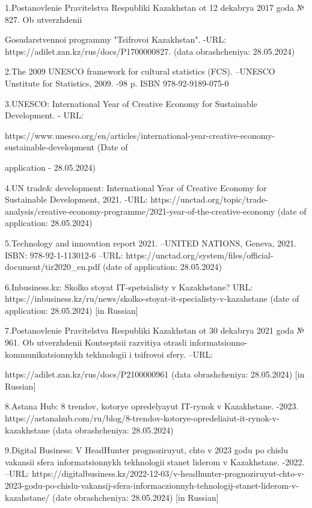 \begin{noparindent}
1.Postanovlenie Pravitel\textquotesingle stva Respubliki Kazakhstan ot
12 dekabrya 2017 goda № 827. Ob utverzhdenii

Gosudarstvennoi programmy
  "Tsifrovoi Kazakhstan". -URL:
  https://adilet.zan.kz/rus/docs/P1700000827. (data obrashcheniya:
  28.05.2024)

2.The 2009 UNESCO framework for cultural statistics (FCS). --UNESCO
  Unstitute for Statistics, 2009. -98 p. ISBN 978-92-9189-075-0

3.UNESCO: International Year of Creative Economy for Sustainable
  Development. - URL:

  https://www.unesco.org/en/articles/international-year-creative-economy-sustainable-development
  (Date of

  application - 28.05.2024)

4.UN trade\& development: International Year of Creative Economy for
  Sustainable Development, 2021. -URL:
  https://unctad.org/topic/trade-analysis/creative-economy-programme/2021-year-of-the-creative-economy
  (date of application: 28.05.2024)

5.Technology and innovation report 2021. --UNITED NATIONS, Geneva, 2021.
  ISBN: 978-92-1-113012-6 --URL:
  https://unctad.org/system/files/official-document/tir2020\_en.pdf
  (date of application: 28.05.2024)

6.Inbusiness.kz: Skol\textquotesingle ko stoyat IT-spetsialisty v
  Kazakhstane? URL:
  https://inbusiness.kz/ru/news/skolko-stoyat-it-specialisty-v-kazahstane
  (date of application: 28.05.2024) {[}in Russian{]}

7.Postanovlenie Pravitel\textquotesingle stva Respubliki Kazakhstan ot
  30 dekabrya 2021 goda № 961. Ob utverzhdenii Kontseptsii razvitiya
  otrasli informatsionno-kommunikatsionnykh tekhnologii i tsifrovoi
  sfery. --URL:

  https://adilet.zan.kz/rus/docs/P2100000961 (data
  obrashcheniya: 28.05.2024) {[}in Russian{]}

8.Astana Hub: 8 trendov, kotorye opredelyayut IT-rynok v Kazakhstane.
  -2023.
  https://astanahub.com/ru/blog/8-trendov-kotorye-opredeliaiut-it-rynok-v-kazakhstane
  (data obrashcheniya: 28.05.2024)

9.Digital Business: V HeadHunter prognoziruyut, chto v 2023 godu po
  chislu vakansii sfera informatsionnykh tekhnologii stanet liderom v
  Kazakhstane. -2022. --URL:
  https://digitalbusiness.kz/2022-12-03/v-headhunter-prognoziruyut-chto-v-2023-godu-po-chislu-vakansij-sfera-informaczionnyh-tehnologij-stanet-liderom-v-kazahstane/
  (date obrashcheniya: 28.05.2024) {[}in Russian{]}


\end{noparindent}
